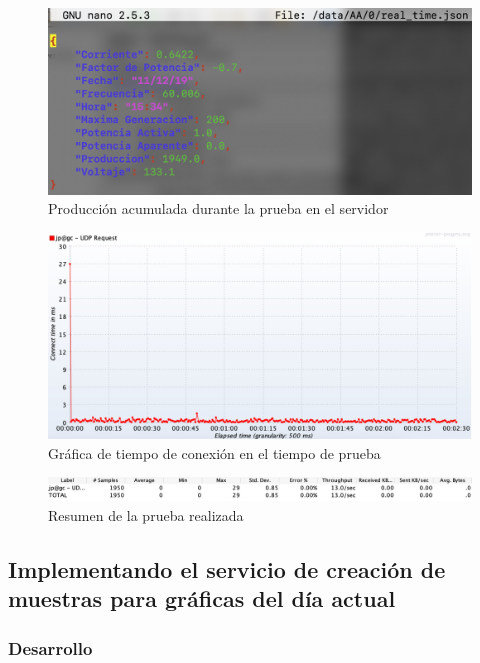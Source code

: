 \begin{figure}[H]
	\centering
	\includegraphics[scale=.5]{Capitulo5/images/udp_test_production.png}
	\caption{Producción acumulada durante la prueba en el servidor}
	\label{fig:udptestjson}
\end{figure} 

\begin{figure}[H]
	\centering
	\includegraphics[scale=.3]{Capitulo5/images/udp_test_connect.png}
	\caption{Gráfica de tiempo de conexión en el tiempo de prueba}
	\label{fig:udpconnect}
\end{figure} 

\begin{figure}[H]
	\centering
	\includegraphics[scale=.5]{Capitulo5/images/udp_test_summary.png}
	\caption{Resumen de la prueba realizada}
	\label{fig:udpsummary}
\end{figure} 

\subsection{Implementando el servicio de creación de muestras para  gráficas del día actual}

\subsubsection{Desarrollo}


